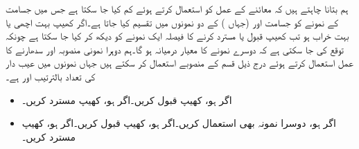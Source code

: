 ہم بتانا چاہتے ہیں کہ معائنے کے عمل کو  استعمال کرتے ہوئے کم کیا جا سکتا ہے جس میں جسامت  کے نمونے کو جسامت  اور  (جہاں )  کے دو نمونوں میں تقسیم کیا جاتا ہے۔اگر کھیپ بہت اچھی یا بہت خراب ہو تب کھیپ قبول یا مسترد کرنے کا فیصلہ ایک نمونے کو دیکھ کر کیا جا سکتا ہے چونکہ توقع کی جا سکتی ہے کہ دوسرے نمونے  کا معیار درمیانہ ہو گا۔ہم دوہرا نمونی منصوبہ اور سدھارنے کا عمل استعمال کرتے ہوئے  درج ذیل قسم کے منصوبے استعمال کر سکتے ہیں جہاں نمونوں میں عیب دار کی تعداد بالترتیب  اور  ہے۔
\begin{itemize}
\item
اگر  ہو، کھیپ قبول کریں۔اگر  ہو، کھیپ مسترد کریں۔
\item
اگر  ہو، دوسرا نمونہ بھی استعمال کریں۔اگر  ہو، کھیپ قبول کریں۔اگر  ہو، کھیپ مسترد کریں۔
\end{itemize}

